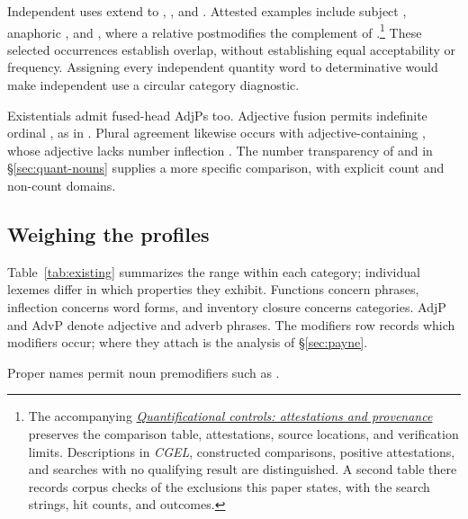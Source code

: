 \documentclass[12pt]{article}
\begin{document}
Independent uses extend to , , and . Attested examples include subject , anaphoric , and , where a relative postmodifies the complement of .\footnote{The accompanying \href{run:quantifier-controls.pdf}{\textit{Quantificational controls: attestations and provenance}} preserves the comparison table, attestations, source locations, and verification limits. Descriptions in \textit{CGEL}, constructed comparisons, positive attestations, and searches with no qualifying result are distinguished. A second table there records corpus checks of the exclusions this paper states, with the search strings, hit counts, and outcomes.} These selected occurrences establish overlap, without establishing equal acceptability or frequency. Assigning every independent quantity word to determinative would make independent use a circular category diagnostic.

Existentials admit fused-head AdjPs too. Adjective fusion permits indefinite ordinal  \citep[416]{huddleston2002}, as in . Plural agreement likewise occurs with adjective-containing , whose adjective lacks number inflection \citep[418]{huddleston2002}. The number transparency of  and  in §\ref{sec:quant-nouns} supplies a more specific comparison, with explicit count and non-count domains.

\subsection{Weighing the profiles}\label{sec:membership}

Table~\ref{tab:existing} summarizes the range within each category; individual lexemes differ in which properties they exhibit. Functions concern phrases, inflection concerns word forms, and inventory closure concerns categories. AdjP and AdvP denote adjective and adverb phrases. The modifiers row records which modifiers occur; where they attach is the analysis of §\ref{sec:payne}.

Proper names permit noun premodifiers such as  \citep[520]{huddleston2002}.
\end{document}
